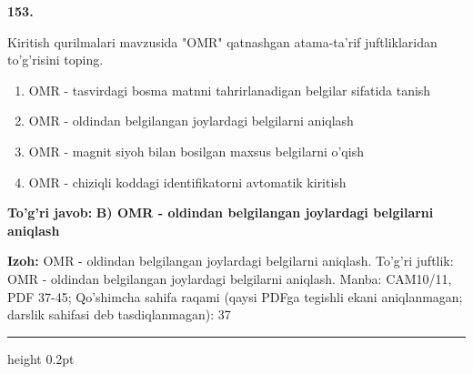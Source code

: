 \documentclass[10pt,a4paper]{article}
\begin{document}
{\bfseries\sffamily\color{ink} 153.}
\par
Kiritish qurilmalari mavzusida "OMR" qatnashgan atama-ta'rif juftliklaridan to'g'risini toping.
\begin{enumerate}[label=\Alph*),leftmargin=9mm]
\item OMR - tasvirdagi bosma matnni tahrirlanadigan belgilar sifatida tanish
\item OMR - oldindan belgilangan joylardagi belgilarni aniqlash
\item OMR - magnit siyoh bilan bosilgan maxsus belgilarni o'qish
\item OMR - chiziqli koddagi identifikatorni avtomatik kiritish
\end{enumerate}
\begin{tcolorbox}[enhanced,breakable,colback=teal!4,colframe=teal!60!black,boxrule=0.45pt,arc=1.2mm,left=2.7mm,right=2.7mm,top=1.8mm,bottom=1.8mm,before skip=2mm,after skip=2mm]
{\bfseries\sffamily\color{teal}To'g'ri javob:} \textbf{B) OMR - oldindan belgilangan joylardagi belgilarni aniqlash}
\par\smallskip
{\bfseries Izoh:} OMR - oldindan belgilangan joylardagi belgilarni aniqlash. To'g'ri juftlik: OMR - oldindan belgilangan joylardagi belgilarni aniqlash. Manba: CAM10/11, PDF 37-45; Qo'shimcha sahifa raqami (qaysi PDFga tegishli ekani aniqlanmagan; darslik sahifasi deb tasdiqlanmagan): 37
\end{tcolorbox}
\vspace{2mm}\hrule height 0.2pt\vspace{3mm}
\end{document}
